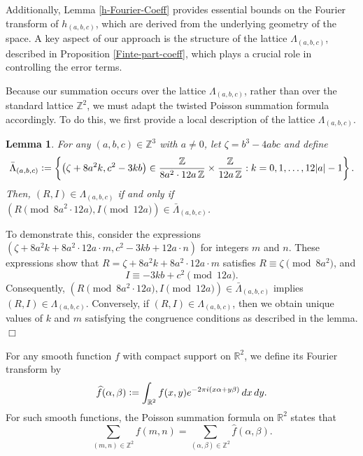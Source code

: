 \documentclass{article}
\newtheorem{lemma}[theorem]{Lemma}
\newenvironment{proof}{\noindent {\bf Proof:}}{$\Box$ \vspace{2 ex}}
\begin{document}
Additionally, Lemma \ref{h-Fourier-Coeff} provides essential bounds on the Fourier transform of $h_{(a,b,c)}$, which are derived from the underlying geometry of the space. A key aspect of our approach is the structure of the lattice $\Lambda_{(a, b, c)}$, described in Proposition \ref{Finte-part-coeff}, which plays a crucial role in controlling the error terms.


Because our summation occurs over the lattice $\Lambda_{(a, b, c)}$, rather than over the standard lattice $\mathbb{Z}^2$, we must adapt the twisted Poisson summation formula accordingly. To do this, we first provide a local description of the lattice $\Lambda_{(a, b, c)}$.

\begin{lemma}\label{Lambda(a,b,c)} For any $(a, b, c) \in \mathbb{Z}^3$ with $a \neq 0$, let $\zeta = b^3 - 4abc$ and define 
\begin{equation*} \bar{\Lambda}_{(a, b, c)} \vcentcolon= \left\{ \left(\zeta + 8a^2k,  c^2-3kb\right) \in \frac{\mathbb{Z}}{8a^2 \cdot 12a \, \mathbb{Z}} \times \frac{\mathbb{Z}}{12a \, \mathbb{Z}} : k = 0, 1, \dots, 12|a| - 1 \right\}. \end{equation*} 
Then, $(R, I) \in \Lambda_{(a, b, c)}$ if and only if $(R \pmod{8a^2 \cdot 12a}, I \pmod{12a}) \in \bar{\Lambda}_{(a, b, c)}$. 
\end{lemma}
\begin{proof} 
 To demonstrate this, consider the expressions 
$\left( \zeta + 8a^2 k + 8a^2 \cdot 12a \cdot m,  c^2 -3kb+ 12a \cdot n \right)$
for integers $m$ and $n$. These expressions show that 
$R = \zeta + 8a^2 k + 8a^2 \cdot 12a \cdot m$ satisfies 
$R \equiv \zeta \pmod{8a^2}$, and
    \begin{equation*}
        I \equiv -3kb + c^2 \pmod{12a}.
    \end{equation*}
    Consequently, $(R \pmod{8a^2 \cdot 12a}, I \pmod{12a}) \in \bar{\Lambda}_{(a, b, c)}$ implies $(R, I) \in \Lambda_{(a, b, c)}$. Conversely, if $(R, I) \in \Lambda_{(a, b, c)}$, then we obtain unique values of $k$ and $m$ satisfying the congruence conditions as described in the lemma.
\end{proof}

For any smooth function $f$ with compact support on $\mathbb{R}^2$, we define its Fourier transform by
\begin{equation*}
    \widehat{f}(\alpha, \beta) \vcentcolon= \int_{\mathbb{R}^2} f(x, y) e^{-2 \pi i (x \alpha + y \beta)} \, dx \, dy.
\end{equation*}
For such smooth functions, the Poisson summation formula on $\mathbb{R}^2$ states that
\begin{equation*}
    \sum_{(m, n) \in \mathbb{Z}^2} f(m, n) = \sum_{(\alpha, \beta) \in \mathbb{Z}^2} \widehat{f}(\alpha, \beta).
\end{equation*}
\end{document}
